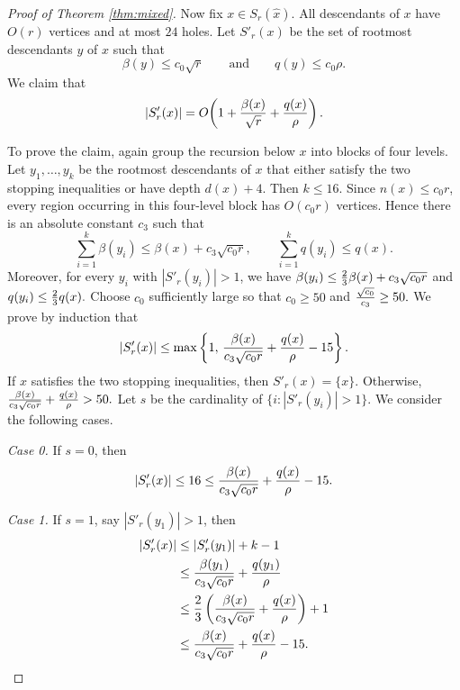 \documentclass[11pt]{article}
\theoremstyle{plain}
\theoremstyle{definition}
\theoremstyle{remark}
\begin{document}
\begin{proof}[Proof of Theorem \ref{thm:mixed}]
Now fix \(x\in S_r(\hat x)\). All descendants of \(x\) have \(O(r)\) vertices and at most \(24\) holes. Let \(S'_r(x)\) be the set of rootmost descendants \(y\) of \(x\) such that
\[
\beta(y)\le c_0\sqrt r
\qquad\text{and}\qquad
q(y)\le c_0\rho.
\]
We claim that
\begin{equation}\label{eq:local-refinement}
|S'_r(x)|
=
O\!\left(1+{\beta(x)\over \sqrt r}+{q(x)\over \rho}\right).
\end{equation}







To prove the claim, again group the recursion below \(x\) into blocks of four levels. Let \(y_1,\ldots,y_k\) be the rootmost descendants of \(x\) that either satisfy the two stopping inequalities or have depth \(d(x)+4\). Then \(k\le 16\).  Since \(n(x)\le c_0r\), every region occurring in this four-level block has \(O(c_0r)\) vertices. Hence there is an absolute constant \(c_3\) such that
\[
\sum_{i=1}^k \beta(y_i)\le \beta(x)+c_3\sqrt{c_0r},
\qquad
\sum_{i=1}^k q(y_i)\le q(x).
\]
Moreover, for every \(y_i\) with \(|S'_r(y_i)|>1\), we have $\beta(y_i)\le {2\over3}\beta(x)+c_3\sqrt{c_0r}$ and $q(y_i)\le {2\over3}q(x).$  Choose \(c_0\) sufficiently large so that $c_0\ge 50$ and ${\sqrt{c_0}\over c_3}\ge 50.$  We prove by induction that
\[
|S'_r(x)|
\le
\max\left\{
1,\,
{\beta(x)\over c_3\sqrt{c_0r}}
+{q(x)\over\rho}
-15
\right\}.
\]
If \(x\) satisfies the two stopping inequalities, then \(S'_r(x)=\{x\}\). Otherwise, ${\beta(x)\over c_3\sqrt{c_0r}}+{q(x)\over\rho}>50.$  Let \(s\) be the cardinality of $\{i:|S'_r(y_i)|>1\}.$  We consider the following cases.

\medskip

\noindent \emph{Case 0.}  If \(s=0\), then
\[
|S'_r(x)|\le 16
\le
{\beta(x)\over c_3\sqrt{c_0r}}+{q(x)\over\rho}-15.
\]

\medskip


\noindent \emph{Case 1.} If \(s=1\), say \(|S'_r(y_1)|>1\), then
\[
\begin{aligned}
|S'_r(x)|
&\le |S'_r(y_1)|+k-1\\
&\le {\beta(y_1)\over c_3\sqrt{c_0r}}
     +{q(y_1)\over\rho}\\
&\le {2\over3}\left(
{\beta(x)\over c_3\sqrt{c_0r}}+{q(x)\over\rho}
\right)+1\\
&\le {\beta(x)\over c_3\sqrt{c_0r}}
     +{q(x)\over\rho}-15.
\end{aligned}
\]

\medskip



\end{proof}
\end{document}
